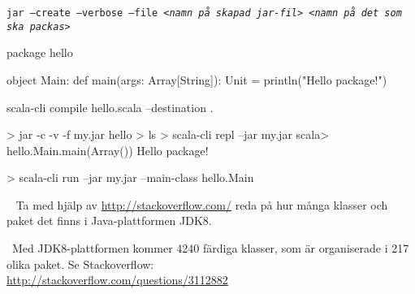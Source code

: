 \TaskSolved \what

\SubtaskSolved

\texttt{jar --create --verbose --file \textit{<namn på skapad jar-fil> <namn på det som ska packas>}}

\SubtaskSolved
\begin{Code}
package hello

object Main:
  def main(args: Array[String]): Unit = println("Hello package!")
\end{Code}

\begin{REPLnonum}
scala-cli compile hello.scala --destination .
\end{REPLnonum}

\SubtaskSolved
\begin{REPL}
> jar -c -v -f my.jar hello
> ls
> scala-cli repl --jar my.jar
scala> hello.Main.main(Array())
Hello package!
\end{REPL}

\SubtaskSolved
\begin{REPL}
> scala-cli run --jar my.jar  --main-class hello.Main
\end{REPL}

\QUESTEND





\QUESTBEGIN

\Task\Uberkurs \what~ Ta med hjälp av \url{http://stackoverflow.com/} reda på hur många klasser och paket det finns i Java-plattformen JDK8.

\SOLUTION

\TaskSolved \what~Med JDK8-plattformen kommer 4240 färdiga klasser, som är organiserade i 217 olika paket. Se Stackoverflow: \\\url{http://stackoverflow.com/questions/3112882}

\QUESTEND

